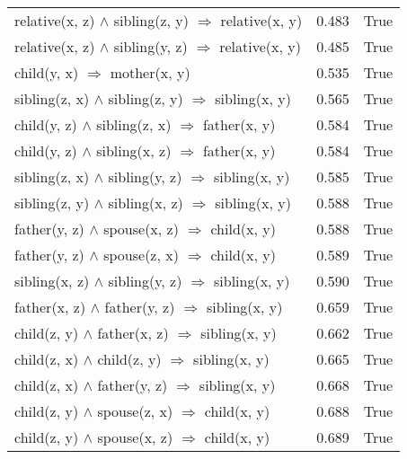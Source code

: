 \begin{longtable}{lrl}
 relative(x, z) $\wedge$ sibling(z, y)   $\Rightarrow$ relative(x, y) &           0.483 &                     True \\
 relative(x, z) $\wedge$ sibling(y, z)   $\Rightarrow$ relative(x, y) &           0.485 &                     True \\
                       child(y, x)   $\Rightarrow$ mother(x, y) &           0.535 &                     True \\
   sibling(z, x) $\wedge$ sibling(z, y)   $\Rightarrow$ sibling(x, y) &           0.565 &                     True \\
      child(y, z) $\wedge$ sibling(z, x)   $\Rightarrow$ father(x, y) &           0.584 &                     True \\
      child(y, z) $\wedge$ sibling(x, z)   $\Rightarrow$ father(x, y) &           0.584 &                     True \\
   sibling(z, x) $\wedge$ sibling(y, z)   $\Rightarrow$ sibling(x, y) &           0.585 &                     True \\
   sibling(z, y) $\wedge$ sibling(x, z)   $\Rightarrow$ sibling(x, y) &           0.588 &                     True \\
       father(y, z) $\wedge$ spouse(x, z)   $\Rightarrow$ child(x, y) &           0.588 &                     True \\
       father(y, z) $\wedge$ spouse(z, x)   $\Rightarrow$ child(x, y) &           0.589 &                     True \\
   sibling(x, z) $\wedge$ sibling(y, z)   $\Rightarrow$ sibling(x, y) &           0.590 &                     True \\
     father(x, z) $\wedge$ father(y, z)   $\Rightarrow$ sibling(x, y) &           0.659 &                     True \\
      child(z, y) $\wedge$ father(x, z)   $\Rightarrow$ sibling(x, y) &           0.662 &                     True \\
       child(z, x) $\wedge$ child(z, y)   $\Rightarrow$ sibling(x, y) &           0.665 &                     True \\
      child(z, x) $\wedge$ father(y, z)   $\Rightarrow$ sibling(x, y) &           0.668 &                     True \\
        child(z, y) $\wedge$ spouse(z, x)   $\Rightarrow$ child(x, y) &           0.688 &                     True \\
        child(z, y) $\wedge$ spouse(x, z)   $\Rightarrow$ child(x, y) &           0.689 &                     True \\

\end{longtable}
